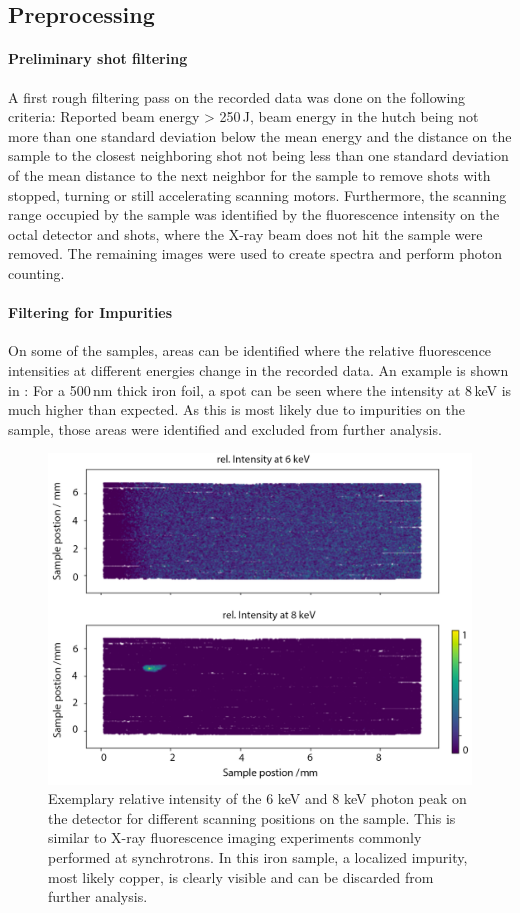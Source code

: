 \subsection{Preprocessing}

\paragraph{Preliminary shot filtering}
A first rough filtering pass on the recorded data was done on the following criteria: Reported beam energy > 250\,\textmu J, beam energy in the hutch being not more than one standard deviation below the mean energy and the distance on the sample to the closest neighboring shot not being less than one standard deviation of the mean distance to the next neighbor for the sample to remove shots with stopped, turning or still accelerating scanning motors. Furthermore, the scanning range occupied by the sample was identified by the fluorescence intensity on the octal detector and shots, where the X-ray beam does not hit the sample were removed. The remaining images were used to create spectra and perform photon counting.


\paragraph{Filtering for Impurities}
On some of the samples, areas can be identified where the relative fluorescence intensities at different energies change in the recorded data. An example is shown in : For a 500\,nm thick iron foil, a spot can be seen where the intensity at 8\,keV is much higher than expected. As this is most likely due to impurities on the sample, those areas were identified and excluded from further analysis.

\begin{figure}
	\centering
	\includegraphics[width=0.75\linewidth]{images/xrf.png}
	\caption[Relative intensity of the 6 keV and 8 keV photon peak on the detector for different scanning positions on one sample]{Exemplary relative intensity of the 6 keV and 8 keV photon peak on the detector for different scanning positions on the sample. This is similar to X-ray fluorescence imaging experiments commonly performed at synchrotrons. In this iron sample, a localized impurity, most likely copper, is clearly visible and can be discarded from further analysis.}
	\label{fig:xrf}
\end{figure}

